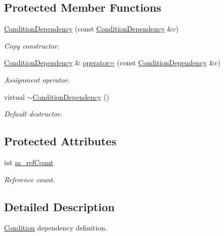 \subsection*{Protected Member Functions}
\begin{DoxyCompactItemize}
\item 
\hyperlink{class_d_d4hep_1_1_conditions_1_1_condition_dependency_ac121f9859fa375681429907880f99bc0}{Condition\+Dependency} (const \hyperlink{class_d_d4hep_1_1_conditions_1_1_condition_dependency}{Condition\+Dependency} \&c)
\begin{DoxyCompactList}\small\item\em Copy constructor. \end{DoxyCompactList}\item 
\hyperlink{class_d_d4hep_1_1_conditions_1_1_condition_dependency}{Condition\+Dependency} \& \hyperlink{class_d_d4hep_1_1_conditions_1_1_condition_dependency_ac1f45d820f6c9dc85e453aa3c3a1cd27}{operator=} (const \hyperlink{class_d_d4hep_1_1_conditions_1_1_condition_dependency}{Condition\+Dependency} \&c)
\begin{DoxyCompactList}\small\item\em Assignment operator. \end{DoxyCompactList}\item 
virtual \hyperlink{class_d_d4hep_1_1_conditions_1_1_condition_dependency_ae92b62f4f395a37f0acbf30f797ccdcd}{$\sim$\+Condition\+Dependency} ()
\begin{DoxyCompactList}\small\item\em Default destructor. \end{DoxyCompactList}\end{DoxyCompactItemize}
\subsection*{Protected Attributes}
\begin{DoxyCompactItemize}
\item 
int \hyperlink{class_d_d4hep_1_1_conditions_1_1_condition_dependency_a0962b46c90825f3ee632af2a25520639}{m\+\_\+ref\+Count}
\begin{DoxyCompactList}\small\item\em Reference count. \end{DoxyCompactList}\end{DoxyCompactItemize}


\subsection{Detailed Description}
\hyperlink{class_d_d4hep_1_1_conditions_1_1_condition}{Condition} dependency definition. 

